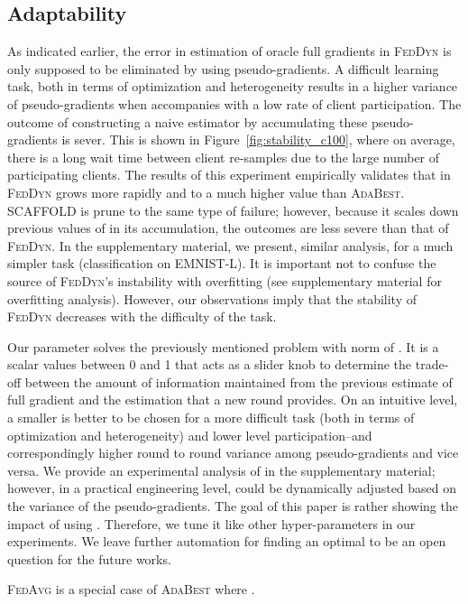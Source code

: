 \documentclass[runningheads]{llncs}
\def\figref#1{Figure~\ref{#1}}
\newcommand{\fedavg}{\textsc{FedAvg}\xspace}
\newcommand{\scaffold}{\textsc{SCAFFOLD}\xspace}
\newcommand{\feddyn}{\textsc{FedDyn}\xspace}
\newcommand{\ours}{\textsc{AdaBest}\xspace}
\def\emnist{{\textsc{EMNIST-L}}}
\begin{document}
\subsection{Adaptability} 
\label{sec:adaptability}
As indicated earlier, the error in estimation of oracle full gradients in \feddyn is only supposed to be eliminated by using pseudo-gradients. A difficult learning task, both in terms of optimization and heterogeneity results in a higher variance of pseudo-gradients when accompanies with a low rate of client participation. The outcome of constructing a naive estimator by accumulating these pseudo-gradients is sever. This is shown in \figref{fig:stability_c100}, where on average, there is a long wait time between client re-samples due to the large number of participating clients.
The results of this experiment empirically validates that  in \feddyn grows more rapidly and to a much higher value than \ours.
\scaffold is prune to the same type of failure; however, because it scales down previous values of  in its accumulation, the outcomes are less severe than that of \feddyn.
In the supplementary material, we present, similar analysis, for a much simpler task (classification on \emnist{}).
It is important not to confuse the source of \feddyn's instability with overfitting (see supplementary material for overfitting analysis). 
However, our observations imply that the stability of \feddyn decreases with the difficulty of the task.

Our parameter  solves the previously mentioned problem with norm of .
It is a scalar values between 0 and 1 that acts as a slider knob to determine the trade-off between the amount of information maintained from the previous estimate of full gradient and the estimation that a new round provides. On an intuitive level, a smaller  is better to be chosen for a more difficult task (both in terms of optimization and heterogeneity) and lower level participation--and correspondingly higher round to round variance among pseudo-gradients and vice versa. We provide an experimental analysis of  in the supplementary material; however, in a practical engineering level,  could be dynamically adjusted based on the variance of the pseudo-gradients. The goal of this paper is rather showing the impact of using . Therefore, we tune it like other hyper-parameters in our experiments.
We leave further automation for finding an optimal  to be an open question for the future works.

\begin{remark}
\label{re:spectrum_fedavg}
\fedavg is a special case of \ours where .
\end{remark}
\end{document}

